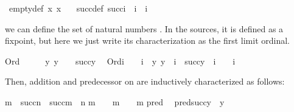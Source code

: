 \begin{isabelle}
\ empty{\uscore}{\kern0pt}def{\isacharprime}{\kern0pt}{\isacharcolon}{\kern0pt}\ {\isachardoublequoteopen}{\isasymforall}x{\isachardot}{\kern0pt}\ x\ {\isasymnotin}\ {}{\isachardoublequoteclose}%
\isanewline
{}
\ succ{\uscore}{\kern0pt}def{\isacharprime}{\kern0pt}{\isacharcolon}{\kern0pt}\ {\isachardoublequoteopen}succ{\isacharparenleft}{\kern0pt}i{\isacharparenright}{\kern0pt}\ {\isacharequal}{\kern0pt}\ i\ {\isasymunion}\ {\isacharbraceleft}{\kern0pt}i{\isacharbraceright}{\kern0pt}{\isachardoublequoteclose}%
\end{isabelle}
%
we can define the set of natural numbers \isa{{\isasymomega}}. In the
sources, it is  defined as a fixpoint, but here we just write
its characterization as the first limit ordinal.%
\begin{isabelle}%
Ord{\isacharparenleft}{\kern0pt}{\isasymomega}{\isacharparenright}{\kern0pt}\ {\isasymand}\ {}\ {\isacharless}{\kern0pt}\ {\isasymomega}\ {\isasymand}\ {\isacharparenleft}{\kern0pt}{\isasymforall}y{\isachardot}{\kern0pt}\ y\ {\isacharless}{\kern0pt}\ {\isasymomega}\ {\isasymlongrightarrow}\ succ{\isacharparenleft}{\kern0pt}y{\isacharparenright}{\kern0pt}\ {\isacharless}{\kern0pt}\ {\isasymomega}{\isacharparenright}{\kern0pt}\isasep\isanewline%
Ord{\isacharparenleft}{\kern0pt}i{\isacharparenright}{\kern0pt}\ {\isasymand}\ {}\ {\isacharless}{\kern0pt}\ i\ {\isasymand}\ {\isacharparenleft}{\kern0pt}{\isasymforall}y{\isachardot}{\kern0pt}\ y\ {\isacharless}{\kern0pt}\ i\ {\isasymlongrightarrow}\ succ{\isacharparenleft}{\kern0pt}y{\isacharparenright}{\kern0pt}\ {\isacharless}{\kern0pt}\ i{\isacharparenright}{\kern0pt}\ {\isasymLongrightarrow}\ {\isasymomega}\ {\isasymle}\ i%
\end{isabelle}%
Then, addition and predecessor on \isa{{\isasymomega}} are inductively
characterized as follows:%
\begin{isabelle}%
m\ {\isacharplus}{\kern0pt}\isactrlsub {\isasymomega}\ succ{\isacharparenleft}{\kern0pt}n{\isacharparenright}{\kern0pt}\ {\isacharequal}{\kern0pt}\ succ{\isacharparenleft}{\kern0pt}m\ {\isacharplus}{\kern0pt}\isactrlsub {\isasymomega}\ n{\isacharparenright}{\kern0pt}\isasep\isanewline%
m\ {\isasymin}\ {\isasymomega}\ {\isasymLongrightarrow}\ m\ {\isacharplus}{\kern0pt}\isactrlsub {\isasymomega}\ {}\ {\isacharequal}{\kern0pt}\ m\isasep\isanewline\isanewline%
pred{\isacharparenleft}{\kern0pt}{}{\isacharparenright}{\kern0pt}\ {\isacharequal}{\kern0pt}\ {}\isasep\isanewline%
pred{\isacharparenleft}{\kern0pt}succ{\isacharparenleft}{\kern0pt}y{\isacharparenright}{\kern0pt}{\isacharparenright}{\kern0pt}\ {\isacharequal}{\kern0pt}\ y%
\end{isabelle}%
